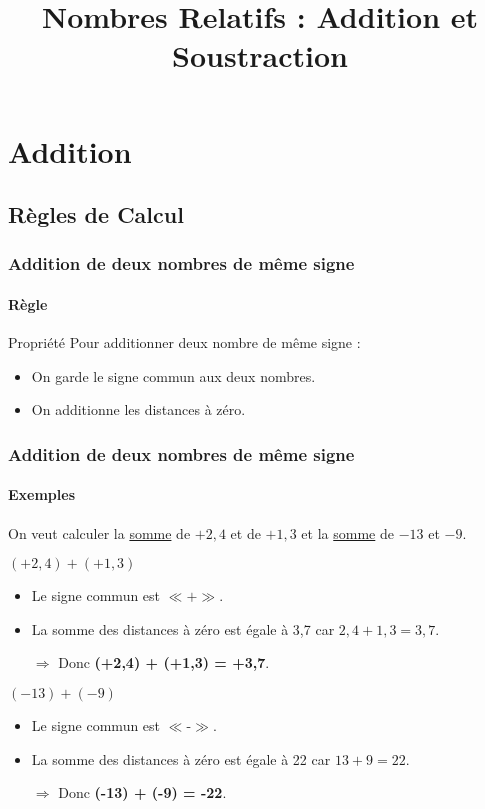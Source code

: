 \documentclass{beamer}
\title{Nombres Relatifs : Addition et Soustraction}
\author{}\institute{}
\begin{document}
	
	
	
\begin{frame}
	\titlepage
\end{frame}

\section{Addition}

\subsection{Règles de Calcul}


\begin{frame}
\frametitle{Addition de deux nombres de même signe}  
\framesubtitle{Règle}	
	
\begin{block}{Propriété}
	Pour additionner deux nombre de même signe :
	\begin{itemize}
		\item On garde le signe commun aux deux nombres.
		\item On additionne les distances à zéro.
	\end{itemize}
\end{block}	

\end{frame}

\begin{frame}
	\frametitle{Addition de deux nombres de même signe}  
	\framesubtitle{Exemples}	
	
	On veut calculer la \underline{somme} de $ +2,4 $ et de $ +1,3 $ et la \underline{somme} de $ -13 $ et $ -9 $.\pause
	
	\begin{exampleblock}{$ (+2,4) + (+1,3) $}
		\begin{itemize}\pause
			\item Le signe commun est $ \ll \textbf{+} \gg $. \pause
			\item La somme des distances à zéro est égale à 3,7 
			car $ 2,4 + 1,3 = 3,7 $. \pause
			\item[$\Rightarrow$] Donc \textbf{(+2,4) + (+1,3) = +3,7}.\pause
		\end{itemize}
	\end{exampleblock}
	
	\begin{exampleblock}{$ (-13) + (-9) $}
		\begin{itemize}
			\item Le signe commun est $ \ll \textbf{-} \gg $.
			\item La somme des distances à zéro est égale à 22 
			car $ 13 + 9 = 22 $.
			\item[$\Rightarrow$] Donc \textbf{(-13) + (-9) = -22}.
		\end{itemize}
	\end{exampleblock}
\end{frame}
\end{document}
